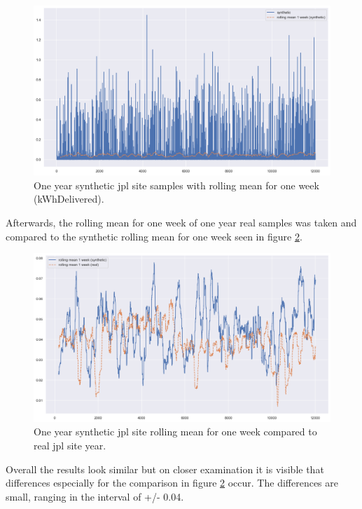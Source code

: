 \begin{figure}[h!]
    \centering
    \includegraphics[width=\textwidth]{images/one_year_rm_jpl_synth.png}
    \caption{One year synthetic jpl site samples with rolling mean for one week (kWhDelivered).}
    \label{fig: jpl syntethic year}
\end{figure}\newline \noindent
Afterwards, the rolling mean for one week of one year real samples was taken and compared to the synthetic rolling mean for one week seen in figure \ref{fig: jpl year comp}.
\begin{figure}[h!]
    \centering
    \includegraphics[width=\textwidth]{images/one_year_rm_jpl_1week_comp.png}
    \caption{One year synthetic jpl site rolling mean for one week compared to real jpl site year.}
    \label{fig: jpl year comp}
\end{figure}\newline \noindent
Overall the results look similar but on closer examination it is visible that differences especially for the comparison in figure \ref{fig: jpl year comp} occur.
The differences are small, ranging in the interval of +/- 0.04.\newline
